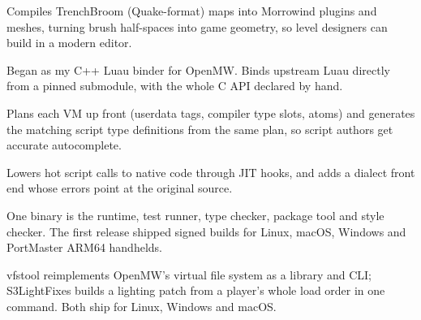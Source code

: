 \documentclass{resume}
\begin{document}
\begin{bullets}
  \item Compiles TrenchBroom (Quake-format) maps into Morrowind plugins and meshes, turning brush half-spaces into game geometry, so level designers can build in a modern editor.
\end{bullets}

\begin{bullets}
  \item Began as my C++ Luau binder for OpenMW. Binds upstream Luau directly from a pinned submodule, with the whole C API declared by hand.
  \item Plans each VM up front (userdata tags, compiler type slots, atoms) and generates the matching script type definitions from the same plan, so script authors get accurate autocomplete.
  \item Lowers hot script calls to native code through JIT hooks, and adds a dialect front end whose errors point at the original source.
\end{bullets}

\begin{bullets}
  \item One binary is the runtime, test runner, type checker, package tool and style checker. The first release shipped signed builds for Linux, macOS, Windows and PortMaster ARM64 handhelds.
\end{bullets}

\begin{bullets}
  \item vfstool reimplements OpenMW's virtual file system as a library and CLI; S3LightFixes builds a lighting patch from a player's whole load order in one command. Both ship for Linux, Windows and macOS.
\end{bullets}
\end{document}

